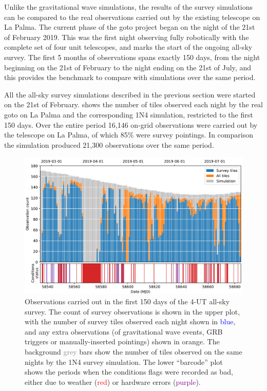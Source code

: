 \begin{colsection}
\begin{colsection}
Unlike the gravitational wave simulations, the results of the survey simulations can be compared to the real observations carried out by the existing telescope on La Palma. The current phase of the \gls{goto} project began on the night of the 21st of February 2019. This was the first night observing fully robotically with the complete set of four unit telescopes, and marks the start of the ongoing all-sky survey. The first 5 months of observations spans exactly 150 days, from the night beginning on the 21st of February to the night ending on the 21st of July, and this provides the benchmark to compare with simulations over the same period.

All the all-sky survey simulations described in the previous section were started on the 21st of February.  shows the number of tiles observed each night by the real \gls{goto} on La Palma and the corresponding 1N4 simulation, restricted to the first 150 days. Over the entire period 16,146 on-grid observations were carried out by the telescope on La Palma, of which 85\% were survey pointings. In comparison the simulation produced 21,300 observations over the same period.

\begin{figure}[t]
    \begin{center}
        \includegraphics[width=\linewidth]{images/150.pdf}
    \end{center}

    \caption[Observations carried out in the first 150 days of the 4-UT all-sky survey]{
        Observations carried out in the first 150 days of the 4-UT all-sky survey. The count of survey observations is shown in the upper plot, with the number of survey tiles observed each night shown in \textcolor{Blue}{blue}, and any extra observations (of gravitational wave events, GRB triggers or manually-inserted pointings) shown in \textcolor{BurntOrange}{orange}. The background \textcolor{Gray}{grey} bars show the number of tiles observed on the same nights by the 1N4 survey simulation. The lower ``barcode'' plot shows the periods when the conditions flags were recorded as bad, either due to weather (\textcolor{Red}{red}) or hardware errors (\textcolor{Purple}{purple}).
    }\label{fig:150}
\end{figure}


\end{colsection}
\end{colsection}
